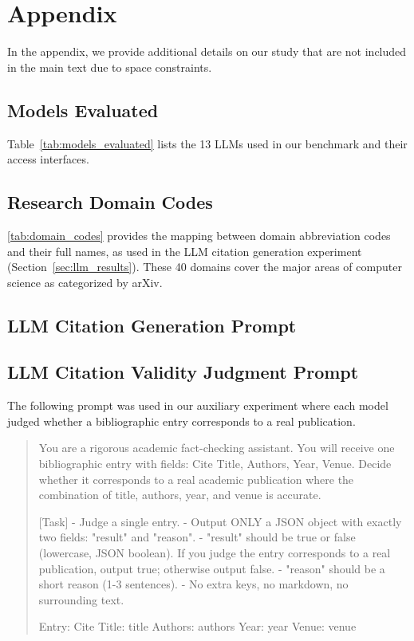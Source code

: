 \section{Appendix}

In the appendix, we provide additional details on our study that are not included in the main text due to space constraints.

\subsection{Models Evaluated}

Table~\ref{tab:models_evaluated} lists the 13 LLMs used in our benchmark and their access interfaces.



\subsection{Research Domain Codes}
\label{app:domain_codes}

\cref{tab:domain_codes} provides the mapping between domain abbreviation codes and their full names, as used in the LLM citation generation experiment (Section~\ref{sec:llm_results}).
These 40 domains cover the major areas of computer science as categorized by arXiv.

\subsection{LLM Citation Generation Prompt}
\label{app:llm_citation_prompt}



\subsection{LLM Citation Validity Judgment Prompt}
\label{app:llm_judge_prompt}


The following prompt was used in our auxiliary experiment where each model judged whether a bibliographic entry corresponds to a real publication.

\begin{quote}
\small
You are a rigorous academic fact-checking assistant. You will receive one bibliographic entry with fields: Cite Title, Authors, Year, Venue. Decide whether it corresponds to a real academic publication where the combination of title, authors, year, and venue is accurate.

[Task]
- Judge a single entry.
- Output ONLY a JSON object with exactly two fields: "result" and "reason".
- "result" should be true or false (lowercase, JSON boolean). If you judge the entry corresponds to a real publication, output true; otherwise output false.
- "reason" should be a short reason (1-3 sentences).
- No extra keys, no markdown, no surrounding text.

Entry:
Cite Title: {title}
Authors: {authors}
Year: {year}
Venue: {venue}
\end{quote}

